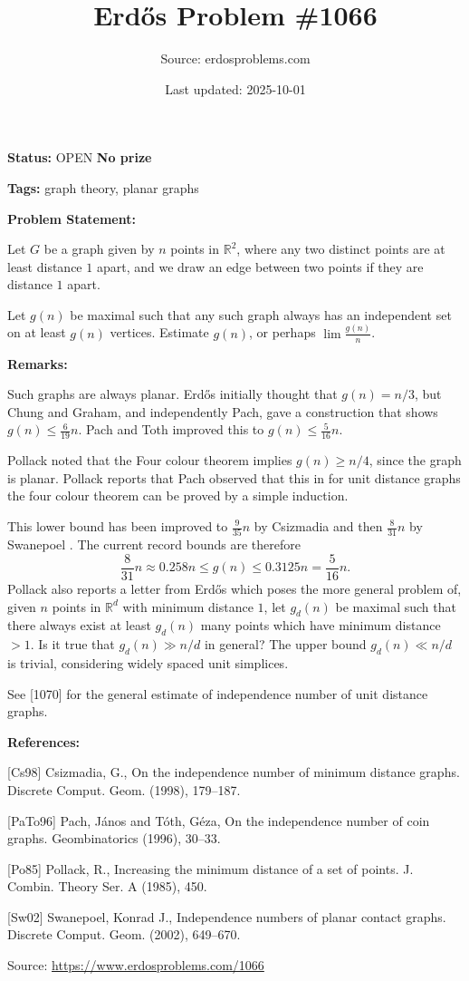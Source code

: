 \documentclass{article}
\title{Erd\H{o}s Problem \#1066}
\date{Last updated: 2025-10-01}
\author{Source: erdosproblems.com}
\begin{document}
\maketitle

\noindent\textbf{Status:} OPEN \quad \textbf{No prize}

\noindent\textbf{Tags:} graph theory, planar graphs

\medskip
\noindent\textbf{Problem Statement:}

Let $G$ be a graph given by $n$ points in $\mathbb{R}^2$, where any two distinct points are at least distance $1$ apart, and we draw an edge between two points if they are distance $1$ apart.

Let $g(n)$ be maximal such that any such graph always has an independent set on at least $g(n)$ vertices. Estimate $g(n)$, or perhaps $\lim \frac{g(n)}{n}$.

\bigskip
\noindent\textbf{Remarks:}

Such graphs are always planar. Erd\H{o}s initially thought that $g(n)=n/3$, but Chung and Graham, and independently Pach, gave a construction that shows $g(n)\leq \frac{6}{19}n$. Pach and Toth \cite{PaTo96} improved this to $g(n)\leq \frac{5}{16}n$.

Pollack \cite{Po85} noted that the Four colour theorem implies $g(n)\geq n/4$, since the graph is planar. Pollack reports that Pach observed that this in for unit distance graphs the four colour theorem can be proved by a simple induction. 

This lower bound has been improved to $\frac{9}{35}n$ by Csizmadia \cite{Cs98} and then $\frac{8}{31}n$ by Swanepoel \cite{Sw02}. The current record bounds are therefore\[\frac{8}{31}n \approx 0.258n \leq g(n) \leq 0.3125n=\frac{5}{16}n.\]Pollack \cite{Po85} also reports a letter from Erd\H{o}s which poses the more general problem of, given $n$ points in $\mathbb{R}^d$ with minimum distance $1$, let $g_d(n)$ be maximal such that there always exist at least $g_d(n)$ many points which have minimum distance $>1$. Is it true that $g_d(n) \gg n/d$ in general? The upper bound $g_d(n) \ll n/d$ is trivial, considering widely spaced unit simplices.

See [1070] for the general estimate of independence number of unit distance graphs.

\bigskip
\noindent\textbf{References:}

[Cs98] Csizmadia, G., On the independence number of minimum distance graphs. Discrete Comput. Geom. (1998), 179--187.
 
 [PaTo96] Pach, J\'{a}nos and T\'oth, G\'{e}za, On the independence number of coin graphs. Geombinatorics (1996), 30--33.
 
 [Po85] Pollack, R., Increasing the minimum distance of a set of points. J. Combin. Theory Ser. A (1985), 450.
 
 [Sw02] Swanepoel, Konrad J., Independence numbers of planar contact graphs. Discrete Comput. Geom. (2002), 649--670.

\bigskip
\noindent\small{Source: \url{https://www.erdosproblems.com/1066}}
\end{document}
